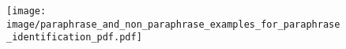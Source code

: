 \begin{figure}[t]
 \centering
  \texttt{[image: image/paraphrase\_and\_non\_paraphrase\_examples\_for\_paraphrase\_identification\_pdf.pdf]}
 \caption{}
 \label{fig:annotation_example_for_paraphrase_identification}
\end{figure}